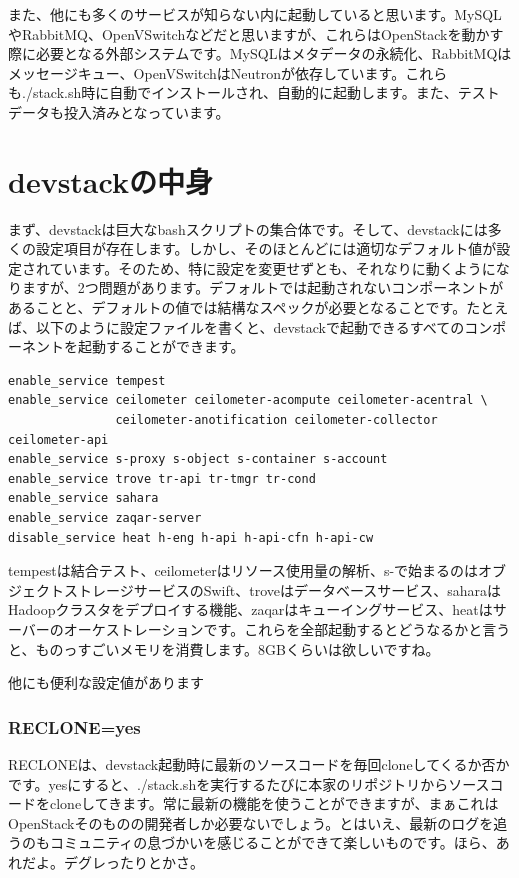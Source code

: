 \documentclass[9pt,b5paper,tombo,openany]{jsbook}
\begin{document}
また、他にも多くのサービスが知らない内に起動していると思います。MySQLやRabbitMQ、OpenVSwitchなどだと思いますが、これらはOpenStackを動かす際に必要となる外部システムです。MySQLはメタデータの永続化、RabbitMQはメッセージキュー、OpenVSwitchはNeutronが依存しています。これらも./stack.sh時に自動でインストールされ、自動的に起動します。また、テストデータも投入済みとなっています。

\section{devstackの中身}

まず、devstackは巨大なbashスクリプトの集合体です。そして、devstackには多くの設定項目が存在します。しかし、そのほとんどには適切なデフォルト値が設定されています。そのため、特に設定を変更せずとも、それなりに動くようになりますが、2つ問題があります。デフォルトでは起動されないコンポーネントがあることと、デフォルトの値では結構なスペックが必要となることです。たとえば、以下のように設定ファイルを書くと、devstackで起動できるすべてのコンポーネントを起動することができます。

\begin{lstlisting}
enable_service tempest
enable_service ceilometer ceilometer-acompute ceilometer-acentral \
               ceilometer-anotification ceilometer-collector ceilometer-api
enable_service s-proxy s-object s-container s-account
enable_service trove tr-api tr-tmgr tr-cond
enable_service sahara
enable_service zaqar-server
disable_service heat h-eng h-api h-api-cfn h-api-cw
\end{lstlisting}

tempestは結合テスト、ceilometerはリソース使用量の解析、s-で始まるのはオブジェクトストレージサービスのSwift、troveはデータベースサービス、saharaはHadoopクラスタをデプロイする機能、zaqarはキューイングサービス、heatはサーバーのオーケストレーションです。これらを全部起動するとどうなるかと言うと、ものっすごいメモリを消費します。8GBくらいは欲しいですね。

他にも便利な設定値があります

\subsubsection{RECLONE=yes}

RECLONEは、devstack起動時に最新のソースコードを毎回cloneしてくるか否かです。yesにすると、./stack.shを実行するたびに本家のリポジトリからソースコードをcloneしてきます。常に最新の機能を使うことができますが、まぁこれはOpenStackそのものの開発者しか必要ないでしょう。とはいえ、最新のログを追うのもコミュニティの息づかいを感じることができて楽しいものです。ほら、あれだよ。デグレったりとかさ。
\end{document}
